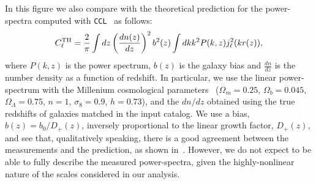 \documentclass[\docopts]{\docclass}
\begin{document}
In this figure we also compare with the theoretical prediction for the power-spectra computed with \texttt{CCL}~\citep{2019ApJS..242....2C} as follows:
\begin{equation}
C_{\ell}^{\rm TH} = \frac{2}{\pi}\int{dz} \left(\frac{dn(z)}{dz}\right)^{2} b^{2}(z) \int{dk k^{2} P(k,z)j^{2}_{\ell}(kr(z))},
\end{equation}
where $P(k,z)$ is the power spectrum, $b(z)$ is the galaxy bias and $\frac{dn}{dz}$ is the number density as a function of redshift. In particular, we use the linear power-spectrum with the Millenium cosmological parameters~\citep{2005Nature.435.629S} ($\Omega_{m}=0.25$, $\Omega_{b}=0.045$, $\Omega_{\Lambda}=0.75$, $n=1$, $\sigma_{8}=0.9$, $h=0.73$), and the $dn/dz$ obtained using the true redshifts of galaxies matched in the input catalog. We use a bias, $b(z) = b_{0}/D_{+}(z)$, inversely proportional to the linear growth factor, $D_{+}(z)$, and see that, qualitatively speaking, there is a good agreement between the measurements and the prediction, as shown in~. %
However, we do not expect to be able to fully describe the measured power-spectra, given the highly-nonlinear nature of the scales considered in our analysis.
\end{document}
